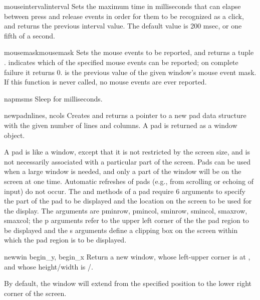 \begin{funcdesc}{mouseinterval}{interval}
Sets the maximum time in milliseconds that can elapse between press and
release events in order for them to be recognized as a click, and
returns the previous interval value.  The default value is 200 msec,
or one fifth of a second.
\end{funcdesc}

\begin{funcdesc}{mousemask}{mousemask}
Sets the mouse events to be reported, and returns a tuple
.  
 indicates which of the
specified mouse events can be reported; on complete failure it returns
0.   is the previous value of the given window's mouse
event mask.  If this function is never called, no mouse events are
ever reported.
\end{funcdesc}

\begin{funcdesc}{napms}{ms}
Sleep for  milliseconds.
\end{funcdesc}

\begin{funcdesc}{newpad}{nlines, ncols}
Creates and returns a pointer to a new pad data structure with the
given number of lines and columns.  A pad is returned as a
window object.

A pad is like a window, except that it is not restricted by the screen
size, and is not necessarily associated with a particular part of the
screen.  Pads can be used when a large window is needed, and only a
part of the window will be on the screen at one time.  Automatic
refreshes of pads (e.g., from scrolling or echoing of input) do not
occur.  The  and  methods of a
pad require 6 arguments to specify the part of the pad to be
displayed and the location on the screen to be used for the display.
The arguments are pminrow, pmincol, sminrow, smincol, smaxrow,
smaxcol; the p arguments refer to the upper left corner of the the pad
region to be displayed and the s arguments define a clipping box on
the screen within which the pad region is to be displayed.
\end{funcdesc}

\begin{funcdesc}{newwin}{ begin_y, begin_x}
Return a new window, whose left-upper corner is at 
, and whose height/width is 
/.  

By default, the window will extend from the 
specified position to the lower right corner of the screen.
\end{funcdesc}


